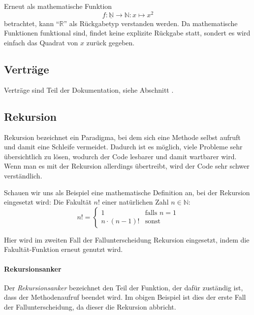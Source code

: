 		Erneut als mathematische Funktion \[ f : \underline{\mathbb{N}} \rightarrow \mathbb{N} : x \mapsto x ^ 2 \] betrachtet, kann \enquote{\(\mathbb{R}\)} als Rückgabetyp verstanden werden. Da mathematische Funktionen funktional sind, findet keine explizite Rückgabe statt, sondert es wird einfach das Quadrat von \(x\) zurück gegeben.

\subsection{Verträge} \functionalMark \imperativeMark \oopMark
	Verträge sind Teil der Dokumentation, siehe Abschnitt .

\subsection{Rekursion} \functionalMark \imperativeMark \oopMark

	
	Rekursion bezeichnet ein Paradigma, bei dem sich eine Methode selbst aufruft und damit eine Schleife vermeidet. Dadurch ist es möglich, viele Probleme sehr übersichtlich zu lösen, wodurch der Code lesbarer und damit wartbarer wird. Wenn man es mit der Rekursion allerdings übertreibt, wird der Code sehr schwer verständlich.
	
	Schauen wir uns als Beispiel eine mathematische Definition an, bei der Rekursion eingesetzt wird: Die Fakultät \( n! \) einer natürlichen Zahl \( n \in \mathbb{N} \):
	\begin{equation*}
		n! =
			\begin{cases}
				1                & \text{falls } n = 1 \\
				n \cdot (n - 1)! & \text{sonst}
			\end{cases}
	\end{equation*}
	
	Hier wird im zweiten Fall der Fallunterscheidung Rekursion eingesetzt, indem die Fakultät-Funktion erneut genutzt wird.
	
	\paragraph{Rekursionsanker}
		Der \textit{Rekursionsanker} bezeichnet den Teil der Funktion, der dafür zuständig ist, dass der Methodenaufruf beendet wird. Im obigen Beispiel ist dies der erste Fall der Fallunterscheidung, da dieser die Rekursion abbricht.
		
